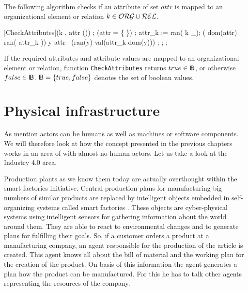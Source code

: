 \noindent The following algorithm checks if an attribute of set $attr$ is mapped to an organizational element or relation $k \in \mathcal{ORG} \cup \mathcal{REL}$.

	\begin{samepage}
	{\small
	\NumberProgramstrue
	\begin{algorithm}[CheckAttributes]\label{alg:CheckAttributes}
	\begin{program}
	\FUNCT |CheckAttributes|(k \in \OrgElementMenge \cup \relationen, attr \subset (\Bezeichner \times \WerteMenge)) \subset \boole
	\BEGIN
	\var {};
	\IF (attr = \{ \})
		\THEN \RETURN \quad \true;
	\ELSE
		attr_k := ran( k \lhd \rel_{\attribute});
		\IF ( dom(attr) \subset ran( attr_k ))
		\THEN
			\FOREACH y \in attr~\DO
				\IF (ran(y) \neq val(attr_k \rhd dom(y)))
				\THEN \RETURN \quad \false;
				\FI
			\OD
			\RETURN \quad \true;
		\ELSE \RETURN \quad \false;
		\FI
	\FI
	\END
	\end{program}
	\end{algorithm}
	\NumberProgramsfalse
	}
	\end{samepage}

\noindent If the required attributes and attribute values are mapped to an organizational element or relation, function {\tt CheckAttributes} returns $true \in { \sf I\!B}$, or otherwise $false \in { \sf I\!B}$. ${ \sf I\!B} = \{ true, false \}$ denotes the set of boolean values.


\section{Physical infrastructure}



As mention actors can be humans as well as machines or software components. We will therefore look at how the concept presented in the previous chapters works in an area of with almost no human actors. Let us take a look at the Industry 4.0 area. 

Production plants as we know them today are actually overthought within the smart factories initiative. Central production plans for manufacturing big numbers of similar products are replaced by intelligent objects embedded in self-organizing systems called smart factories \cite{Gronau2015}. These objects are cyber-physical systems \cite{meissner2013} using intelligent sensors for gathering information about the world around them.  They are able to react to environmental changes and to generate plans for fulfilling their goals. So, if a customer orders a product at a manufacturing company, an agent responsible for the production of the article is created. This agent knows all about the bill of material and the working plan for the creation of the product. On basis of this information the agent generates a plan how the product can be manufactured. For this he has to talk other agents representing the resources of the company. 

